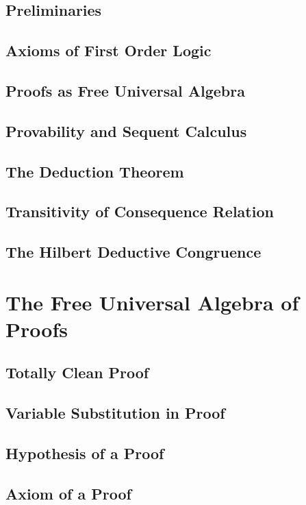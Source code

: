 \documentclass{report}
\begin{document}
    \subsection{Preliminaries}
      
    \subsection{Axioms of First Order Logic}
      
    \subsection{Proofs as Free Universal Algebra}
      
    \subsection{Provability and Sequent Calculus}
      
    \subsection{The Deduction Theorem}
      
    \subsection{Transitivity of Consequence Relation}
      
    \subsection{The Hilbert Deductive Congruence}
      
\section{The Free Universal Algebra of Proofs}
    \subsection{Totally Clean Proof}
      
    \subsection{Variable Substitution in Proof}
      
    \subsection{Hypothesis of a Proof}
      
    \subsection{Axiom of a Proof}
      
\end{document}
